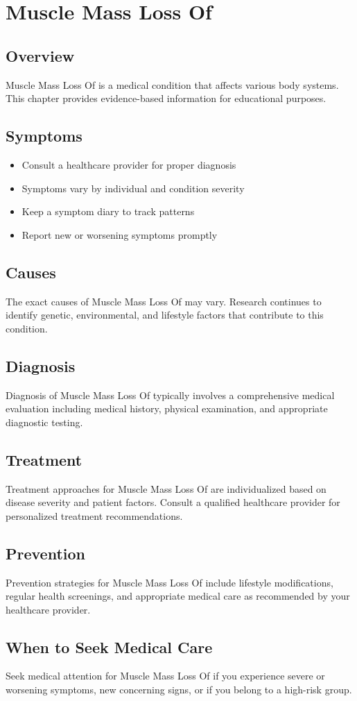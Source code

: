 \chapter{Muscle Mass Loss Of}

\section*{Overview}
Muscle Mass Loss Of is a medical condition that affects various body systems. This chapter provides evidence-based information for educational purposes.

\section*{Symptoms}
\begin{itemize}
  \item Consult a healthcare provider for proper diagnosis
  \item Symptoms vary by individual and condition severity
  \item Keep a symptom diary to track patterns
  \item Report new or worsening symptoms promptly
\end{itemize}

\section*{Causes}
The exact causes of Muscle Mass Loss Of may vary. Research continues to identify genetic, environmental, and lifestyle factors that contribute to this condition.

\section*{Diagnosis}
Diagnosis of Muscle Mass Loss Of typically involves a comprehensive medical evaluation including medical history, physical examination, and appropriate diagnostic testing.

\section*{Treatment}
Treatment approaches for Muscle Mass Loss Of are individualized based on disease severity and patient factors. Consult a qualified healthcare provider for personalized treatment recommendations.

\section*{Prevention}
Prevention strategies for Muscle Mass Loss Of include lifestyle modifications, regular health screenings, and appropriate medical care as recommended by your healthcare provider.

\section*{When to Seek Medical Care}
Seek medical attention for Muscle Mass Loss Of if you experience severe or worsening symptoms, new concerning signs, or if you belong to a high-risk group.
\clearpage
